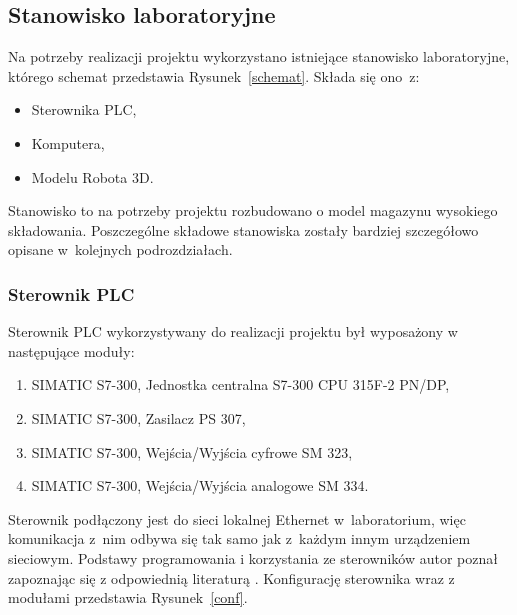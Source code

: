 \subsection{Stanowisko laboratoryjne}
Na potrzeby realizacji projektu wykorzystano istniejące stanowisko laboratoryjne, którego schemat przedstawia Rysunek~\ref{schemat}. Składa się ono~z:
\begin{itemize}
\item Sterownika PLC,
\item Komputera,
\item Modelu Robota 3D.
\end{itemize}
\indent
\indent Stanowisko to na potrzeby projektu rozbudowano o model magazynu wysokiego składowania. Poszczególne składowe stanowiska zostały bardziej szczegółowo opisane w~kolejnych podrozdziałach.
\subsubsection{Sterownik PLC}
Sterownik PLC wykorzystywany do realizacji projektu był wyposażony w następujące moduły:
\begin{enumerate}
\item SIMATIC S7-300, Jednostka centralna S7-300 CPU 315F-2 PN/DP,
\item SIMATIC S7-300, Zasilacz PS 307,
\item SIMATIC S7-300, Wejścia/Wyjścia cyfrowe SM 323,
\item SIMATIC S7-300, Wejścia/Wyjścia analogowe SM 334.
\end{enumerate}
\indent
\indent Sterownik podłączony jest do sieci lokalnej Ethernet w~laboratorium, więc komunikacja z~nim odbywa się tak samo jak z~każdym innym urządzeniem sieciowym. Podstawy programowania i korzystania ze sterowników autor poznał zapoznając się z odpowiednią literaturą \cite{plc1,plc2,plc4,plc5,plc6}.
Konfigurację sterownika wraz z modułami przedstawia Rysunek~\ref{conf}.
